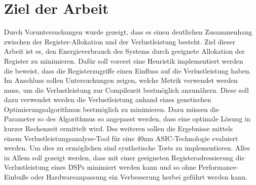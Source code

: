 \section{Ziel der Arbeit}
\label{sec:ziele}
Durch Voruntersuchungen wurde gezeigt, dass es einen deutlichen Zusammenhang zwischen der Register-Allokation und der Verlustleistung besteht. Ziel dieser Arbeit ist es, den Energieverbrauch des Systems durch geeignete Allokation der Register zu minimieren. Dafür soll vorerst eine Heuristik implementiert werden die beweist, dass die Registerzugriffe einen Einfluss auf die Verlustleistung haben. Im Anschluss sollen Untersuchungen zeigen, welche Metrik verwendet werden muss, um die Verlustleistung zur Compilezeit bestmöglich anzunähern. Diese soll dazu verwendet werden die Verlustleistung anhand eines genetischen Optimierungsalgorithmus bestmöglich zu minimieren. Dazu müssen die Parameter so  des Algorithmus so angepasst werden, dass eine optimale Lösung in kurzer Rechenzeit ermittelt wird. Des weiteren sollen die Ergebnisse mittels einem Verlustleistungsanalyse-Tool für eine 40nm ASIC-Technologie evaluiert werden. Um dies zu ermöglichen sind synthetische Tests zu implementieren. Alles in Allem soll gezeigt werden, dass mit einer geeigneten Registeradressierung die Verlustleistung eines DSPs minimiert werden kann und so ohne Performance-Einbuße oder Hardwareanpassung ein Verbesserung herbei geführt werden kann.

%
